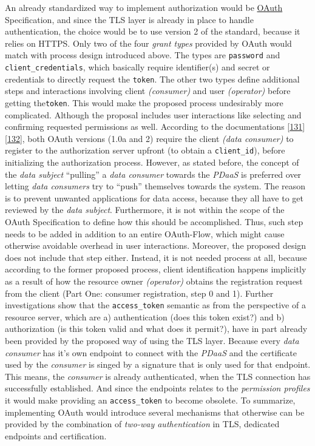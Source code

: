 \documentclass[12pt,english,a4paper,titlepage,cleardoublepage=empty,dottedtoc]{report}
\begin{document}
An already standardized way to implement authorization would be
\protect\hyperlink{link_oauth}{OAuth} Specification, and since the TLS
layer is already in place to handle authentication, the choice would be
to use version 2 of the standard, because it relies on HTTPS. Only two
of the four \emph{grant types} provided by OAuth would match with
process design introduced above. The types are \texttt{password} and
\texttt{client\_credentials}, which basically require identifier(s) and
secret or credentials to directly request the \texttt{token}. The other
two types define additional steps and interactions involving client
\emph{(consumer)} and user \emph{(operator)} before getting
the\texttt{token}. This would make the proposed process undesirably more
complicated. Although the proposal includes user interactions like
selecting and confirming requested permissions as well. According to the
documentations
{[}\protect\hyperlink{ref-web_spec_oauth-1a_client-reg}{131}{]}
{[}\protect\hyperlink{ref-web_spec_oauth-2_client-reg}{132}{]}, both
OAuth versions (1.0a and 2) require the client \emph{(data consumer)} to
register to the authorization server upfront (to obtain a
\texttt{client\_id}), before initializing the authorization process.
However, as stated before, the concept of the \emph{data subject}
``pulling'' a \emph{data consumer} towards the \emph{PDaaS} is preferred
over letting \emph{data consumers} try to ``push'' themselves towards
the system. The reason is to prevent unwanted applications for data
access, because they all have to get reviewed by the \emph{data
subject}. Furthermore, it is not within the scope of the OAuth
Specification to define how this should be accomplished. Thus, such step
needs to be added in addition to an entire OAuth-Flow, which might cause
otherwise avoidable overhead in user interactions. Moreover, the
proposed design does not include that step either. Instead, it is not
needed process at all, because according to the former proposed process,
client identification happens implicitly as a result of how the resource
owner \emph{(operator)} obtains the registration request from the client
(Part One: consumer registration, step 0 and 1). Further investigations
show that the \texttt{access\_token} semantic as from the perspective of
a resource server, which are a) authentication (does this token exist?)
and b) authorization (is this token valid and what does it permit?),
have in part already been provided by the proposed way of using the TLS
layer. Because every \emph{data consumer} has it's own endpoint to
connect with the \emph{PDaaS} and the certificate used by the
\emph{consumer} is singed by a signature that is only used for that
endpoint. This means, the \emph{consumer} is already authenticated, when
the TLS connection has successfully established. And since the endpoints
relates to the \emph{permission profiles} it would make providing an
\texttt{access\_token} to become obsolete. To summarize, implementing
OAuth would introduce several mechanisms that otherwise can be provided
by the combination of \emph{two-way authentication} in TLS, dedicated
endpoints and certification.
\end{document}
